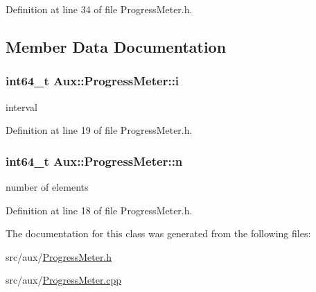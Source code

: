 Definition at line 34 of file Progress\-Meter.\-h.



\subsection{Member Data Documentation}
\hypertarget{class_aux_1_1_progress_meter_a9010eced162c940f8e790efa6b7b7951}{
\subsubsection[{i}]{\setlength{\rightskip}{0pt plus 5cm}int64\-\_\-t Aux\-::\-Progress\-Meter\-::i\hspace{0.3cm}{\ttfamily [protected]}}}\label{class_aux_1_1_progress_meter_a9010eced162c940f8e790efa6b7b7951}


interval 



Definition at line 19 of file Progress\-Meter.\-h.

\hypertarget{class_aux_1_1_progress_meter_aff17aa3d8448d8bcc181ba9c5752a994}{
\subsubsection[{n}]{\setlength{\rightskip}{0pt plus 5cm}int64\-\_\-t Aux\-::\-Progress\-Meter\-::n\hspace{0.3cm}{\ttfamily [protected]}}}\label{class_aux_1_1_progress_meter_aff17aa3d8448d8bcc181ba9c5752a994}


number of elements 



Definition at line 18 of file Progress\-Meter.\-h.



The documentation for this class was generated from the following files\-:\begin{DoxyCompactItemize}
\item 
src/aux/\hyperlink{_progress_meter_8h}{Progress\-Meter.\-h}\item 
src/aux/\hyperlink{_progress_meter_8cpp}{Progress\-Meter.\-cpp}\end{DoxyCompactItemize}
